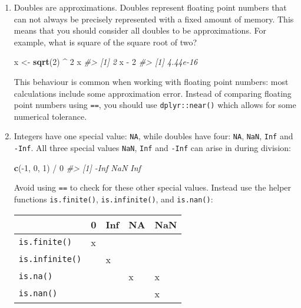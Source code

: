 \documentclass[]{book}
\newenvironment{Shaded}{\begin{snugshade}}{\end{snugshade}}
\newcommand{\KeywordTok}[1]{\textcolor[rgb]{0.13,0.29,0.53}{\textbf{{#1}}}}
\newcommand{\DecValTok}[1]{\textcolor[rgb]{0.00,0.00,0.81}{{#1}}}
\newcommand{\StringTok}[1]{\textcolor[rgb]{0.31,0.60,0.02}{{#1}}}
\newcommand{\CommentTok}[1]{\textcolor[rgb]{0.56,0.35,0.01}{\textit{{#1}}}}
\newcommand{\NormalTok}[1]{{#1}}
\begin{document}
\begin{enumerate}
\def\labelenumi{\arabic{enumi}.}
\item
  Doubles are approximations. Doubles represent floating point numbers
  that can not always be precisely represented with a fixed amount of
  memory. This means that you should consider all doubles to be
  approximations. For example, what is square of the square root of two?

\begin{Shaded}
\begin{Highlighting}[]
\NormalTok{x <-}\StringTok{ }\KeywordTok{sqrt}\NormalTok{(}\DecValTok{2}\NormalTok{) ^}\StringTok{ }\DecValTok{2}
\NormalTok{x}
\CommentTok{#> [1] 2}
\NormalTok{x -}\StringTok{ }\DecValTok{2}
\CommentTok{#> [1] 4.44e-16}
\end{Highlighting}
\end{Shaded}

  This behaviour is common when working with floating point numbers:
  most calculations include some approximation error. Instead of
  comparing floating point numbers using \texttt{==}, you should use
  \texttt{dplyr::near()} which allows for some numerical tolerance.
\item
  Integers have one special value: \texttt{NA}, while doubles have four:
  \texttt{NA}, \texttt{NaN}, \texttt{Inf} and \texttt{-Inf}. All three
  special values \texttt{NaN}, \texttt{Inf} and \texttt{-Inf} can arise
  in during division:

\begin{Shaded}
\begin{Highlighting}[]
\KeywordTok{c}\NormalTok{(-}\DecValTok{1}\NormalTok{, }\DecValTok{0}\NormalTok{, }\DecValTok{1}\NormalTok{) /}\StringTok{ }\DecValTok{0}
\CommentTok{#> [1] -Inf  NaN  Inf}
\end{Highlighting}
\end{Shaded}

  Avoid using \texttt{==} to check for these other special values.
  Instead use the helper functions \texttt{is.finite()},
  \texttt{is.infinite()}, and \texttt{is.nan()}:

  \begin{longtable}[]{@{}lllll@{}}
  \toprule
  & 0 & Inf & NA & NaN\tabularnewline
  \midrule
  \endhead
  \texttt{is.finite()} & x & & &\tabularnewline
  \texttt{is.infinite()} & & x & &\tabularnewline
  \texttt{is.na()} & & & x & x\tabularnewline
  \texttt{is.nan()} & & & & x\tabularnewline
  \bottomrule
  \end{longtable}
\end{enumerate}
\end{document}
